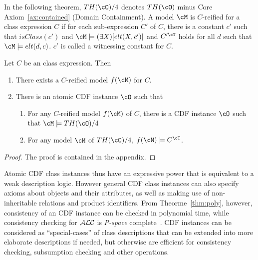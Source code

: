 In the following theorem, $TH(\cO)/4$ denotes $TH(\cO)$ minus Core
Axiom~\ref{ax:contained} (Domain Containment).  A model $\cM$ is
$C$-reified for a class expression $C$ if for each sub-expression $C'$
of $C$, there is a constant $c'$ such that $isClass(c')$ and $\cM
\models (\exists X)[elt(X,c')]$ and $C'^{\cT}$ holds for all $d$ such
that $\cM \models elt(d,c)$.   $c'$ is called a witnessing constant for
$C$.

\begin{theorem}
Let $C$ be an \omsdl{} class expression.  Then 
\begin{enumerate}
\item There exists a $C$-reified model $f(\cM)$ for $C$.  
\item There is an atomic CDF instance $\cO$ such that 
\begin{enumerate}
\item For any $C$-reified model $f(\cM)$ of $C$, there is a CDF instance
$\cO$ such that $\cM \models TH(\cO)/4$
\item For any model $\cM$ of $TH(\cO)/4$, $f(\cM) \models C^{\cT}$.
\end{enumerate}
\end{enumerate}
\end{theorem}
\begin{proof}
The proof is contained in the appendix.
\end{proof}

Atomic CDF class instances thus have an expressive power that is
equivalent to a weak description logic.  However general CDF class
instances can also specify axioms about objects and their attributes,
as well as making use of non-inheritable relations and product
identifiers.  From Theorme~\ref{thm:poly}, however, consistency of an
CDF instance can be checked in polynomial time, while consistency
checking for ${\cal ALC}$ is {\em P-space} complete~\cite{ShmS91}.
CDF instances can be considered as ``special-cases'' of class
descriptions that can be extended into more elaborate descriptions if
needed, but otherwise are efficient for consistency checking,
subsumption checking and other operations.

